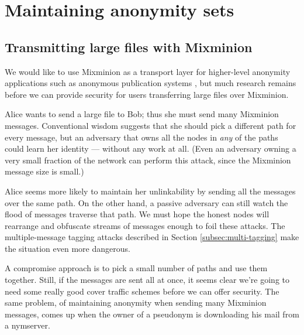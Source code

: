 \documentclass{llncs}
\begin{document}
\section{Maintaining anonymity sets}
\label{sec:maintaining-anonymity}

\subsection{Transmitting large files with Mixminion}

We would like to use Mixminion as a transport layer for higher-level
anonymity applications such as anonymous publication systems
\cite{freehaven-berk}, but much research remains before we can
provide security for users transferring large files over Mixminion.

Alice wants to send a large file to Bob; thus she must send many Mixminion
messages. Conventional wisdom suggests that she should pick a different
path for every message, but an adversary that owns all the nodes in
\emph{any} of the paths could learn her identity --- without any work
at all. (Even an adversary owning a very small fraction of the network
can perform this attack, since the Mixminion message size is small.)


Alice seems more likely to maintain her unlinkability by sending all the
messages over the same path. On the other hand, a passive adversary can
still watch the flood of messages traverse that path. We must hope the
honest nodes will rearrange and obfuscate streams of messages enough to
foil these attacks. The multiple-message tagging attacks described in
Section \ref{subsec:multi-tagging} make the situation even more dangerous.

A compromise approach is to pick a small number of paths and use them
together. Still, if the messages are sent all at once, it seems clear
we're going to need some really good cover traffic schemes before we
can offer security. The same problem, of maintaining anonymity when
sending many Mixminion messages, comes up when the owner of a pseudonym
is downloading his mail from a nymserver.
\end{document}

